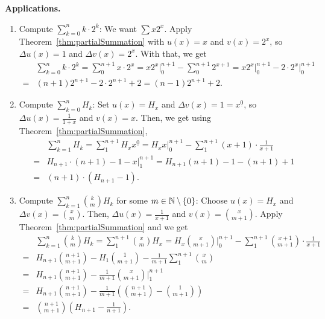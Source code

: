 \documentclass[language=english]{../../Template/TemplateLecture}
\begin{document}
\textbf{Applications.}
\begin{enumerate}[$(i)$]
    \item Compute $\sum_{k = 0}^n k \cdot 2^k$: We want $\sum x 2^x$. Apply Theorem~\ref{thm:partialSummation} with $u(x) = x$ and $v(x) = 2^x$, so $\Delta u(x) = 1$ and $\Delta v(x) = 2^x$. With that, we get
    \begin{equation}
        \begin{split}
            &\sum_{k = 0}^n k \cdot 2^k = \sum_{0}^{n+1} x \cdot 2^x = x2^x\Big|_0^{n+1} - \sum_0^{n+1}2^{x+1} = x2^x\Big|_0^{n+1} - 2 \cdot 2^x\Big|_0^{n+1} \\
            =& (n+1)2^{n+1} - 2 \cdot 2^{n+1} + 2 = (n-1)2^{n+1} + 2.
        \end{split}
    \end{equation} 
    \item Compute $\sum_{k = 0}^n H_k$: Set $u(x) = H_x$ and $\Delta v(x) = 1 = x^{\underline{0}}$, so $\Delta u(x) = \frac{1}{1+x}$ and $v(x) = x$. Then, we get using Theorem~\ref{thm:partialSummation},
    \begin{equation}
        \begin{split}
            &\sum_{k = 1}^n H_k = \sum_1^{n+1} H_x x^{\underline{0}} = H_x x\Big|_0^{n+1} - \sum_1^{n+1} (x+1) \cdot \frac{1}{x+1} \\
            =& H_{n+1} \cdot (n+1) - 1 - x\Big|_1^{n+1} = H_{n+1} (n+1) - 1 - (n+1) + 1 \\
            =& (n+1) \cdot (H_{n+1} - 1).
        \end{split}
    \end{equation}
    \item Compute $\sum_{k = 1}^n \binom{k}{m}H_k$ for some $m \in \mathbb{N} \setminus \{0\}$: Choose $u(x) = H_x$ and $\Delta v(x) = \binom{x}{m}$. Then, $\Delta u(x) = \frac{1}{x+1}$ and $v(x) = \binom{x}{m+1}$. Apply Theorem~\ref{thm:partialSummation} and we get 
    \begin{equation}
        \begin{split}
            &\sum_{k = 1}^n \binom{k}{m} H_k = \sum_1^{n+1} \binom{x}{m} H_x = H_x \binom{x}{m+1} \Big|_0^{n+1} - \sum_1^{n+1} \binom{x+1}{m+1} \cdot \frac{1}{x+1} \\
            =& H_{n+1}\binom{n+1}{m+1} - H_1\binom{1}{m+1} - \frac{1}{m+1} \sum_1^{n+1} \binom{x}{m} \\
            =& H_{n+1}\binom{n+1}{m+1} - \frac{1}{m+1}\binom{x}{m+1}\Big|_1^{n+1} \\
            =& H_{n+1} \binom{n+1}{m+1} - \frac{1}{m+1}\left(\binom{n+1}{m+1} - \binom{1}{m+1}\right)\\
            =& \binom{n+1}{m+1}\left( H_{n+1} - \frac{1}{n+1} \right).
        \end{split}
    \end{equation}
\end{enumerate}
\end{document}
